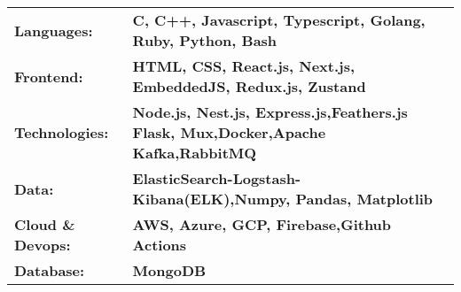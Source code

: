\vspace{2pt}
\begin{tabular}{ @{} l l @{} }
    \textbf{Languages:}       & \textbf{C, C++, Javascript, Typescript, Golang, Ruby, Python, Bash}               \\
    \textbf{Frontend:}        & \textbf{HTML, CSS, React.js, Next.js, EmbeddedJS, Redux.js, Zustand}               \\
\textbf{Technologies:} & \textbf{Node.js, Nest.js, Express.js,Feathers.js Flask, Mux,Docker,Apache Kafka,RabbitMQ} 
\\
\textbf{Data:}        & \textbf{ElasticSearch-Logstash-Kibana(ELK),Numpy, Pandas, Matplotlib}
\\
\textbf{Cloud \& Devops:} & \textbf{AWS, Azure, GCP, Firebase,Github Actions}                                              \\
    \textbf{Database:}        & \textbf{MongoDB}                                                             \\
\end{tabular}

\vspace{2mm}
